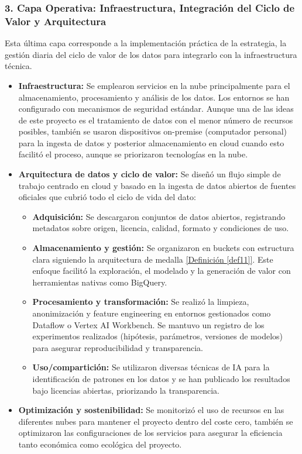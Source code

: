 \subsubsection*{3. Capa Operativa: Infraestructura, Integración del Ciclo de Valor y Arquitectura}
Esta última capa corresponde a la implementación práctica de la estrategia, la gestión diaria del ciclo de valor de los datos para integrarlo con la infraestructura técnica.

\begin{itemize}
	\item \textbf{Infraestructura:} Se emplearon servicios en la nube principalmente para el almacenamiento, procesamiento y análisis de los datos. Los entornos se han configurado con mecanismos de seguridad estándar. Aunque una de las ideas de este proyecto es el tratamiento de datos con el menor número de recursos posibles, también se usaron dispositivos on-premise (computador personal) para la ingesta de datos y posterior almacenamiento en cloud cuando esto facilitó el proceso, aunque se priorizaron tecnologías en la nube.
	
	\item \textbf{Arquitectura de datos y ciclo de valor:} Se diseñó un flujo simple de trabajo centrado en cloud y basado en la ingesta de datos abiertos de fuentes oficiales que cubrió todo el ciclo de vida del dato: 
	\begin{itemize}
		\item \textbf{Adquisición:} Se descargaron conjuntos de datos abiertos, registrando metadatos sobre origen, licencia, calidad, formato y condiciones de uso. 
		
		\item \textbf{Almacenamiento y gestión:} Se organizaron en buckets con estructura clara siguiendo la arquitectura de medalla \hyperref[def11]{[Definición \ref*{def11}]}. Este enfoque facilitó la exploración, el modelado y la generación de valor con herramientas nativas como BigQuery.
		
		\item \textbf{Procesamiento y transformación:} Se realizó la limpieza, anonimización y feature engineering en entornos gestionados como Dataflow o Vertex AI Workbench. Se mantuvo un registro de los experimentos realizados (hipótesis, parámetros, versiones de modelos) para asegurar reproducibilidad y transparencia.
		
		\item \textbf{Uso/compartición:} Se utilizaron diversas técnicas de IA para la identificación de patrones en los datos y se han publicado los resultados bajo licencias abiertas, priorizando la transparencia.
		
	\end{itemize}
	
	\item \textbf{Optimización y sostenibilidad:} Se monitorizó el uso de recursos en las diferentes nubes para mantener el proyecto dentro del coste cero, también se optimizaron las configuraciones de los servicios para asegurar la eficiencia tanto económica como ecológica del proyecto.
\end{itemize}

